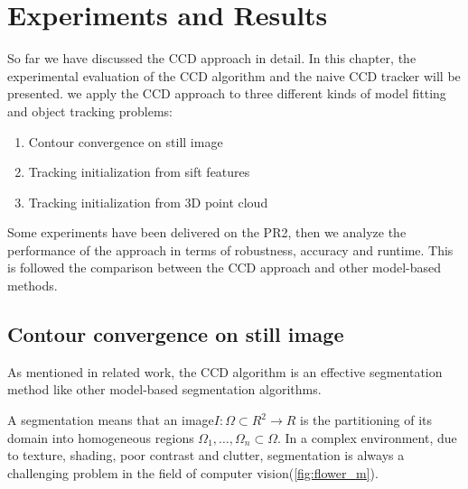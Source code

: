 \chapter{Experiments and Results}
\label{chapter:experiments}

So far we have discussed the CCD approach in detail. In this chapter,
the experimental evaluation of the CCD algorithm and the naive CCD
tracker will be presented. we apply the CCD approach to three
different kinds of model fitting and object tracking problems:

\begin{enumerate}
\item Contour convergence on still image
\item Tracking initialization from sift features
\item Tracking initialization from 3D point cloud
\end{enumerate}

Some experiments have been delivered on the PR2, then we analyze the performance
of the approach in terms of robustness, accuracy and runtime. This is
followed the comparison between the CCD approach and  other
model-based methods.



\section{Contour convergence on still image}
\label{sec:ES}

As mentioned in related work, the CCD algorithm is an effective
segmentation method like other model-based segmentation algorithms.

A segmentation means that an image$I: \Omega \subset R^2 \longrightarrow R$
is the partitioning of its domain into homogeneous regions
$\Omega_1,\ldots, \Omega_n \subset \Omega$. In a complex environment,
due to texture, shading, poor contrast and clutter, segmentation is
always a challenging problem in the field of computer
vision(\ref{fig:flower_m}).

